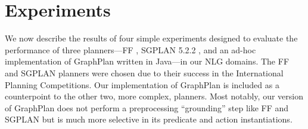 \documentclass[letterpaper]{article}
\begin{document}
%


\section{Experiments}
\label{sec:experiments}

We now describe the results of four simple experiments designed to evaluate
the performance of three planners---FF \citep{HoffmannNebel01}, SGPLAN
5.2.2 \citep{hsu06:_new_featur_in_sgplan_for}, and an ad-hoc implementation
of GraphPlan \citep{Blum1997} written in Java---in our NLG domains. The FF
and SGPLAN planners were chosen due to their success in the International
Planning Competitions. Our implementation of GraphPlan is included as a
counterpoint to the other two, more complex, planners. Most notably, our
version of GraphPlan does not perform a preprocessing ``grounding'' step
like FF and SGPLAN but is much more selective in its predicate and action
instantiations.
\end{document}
